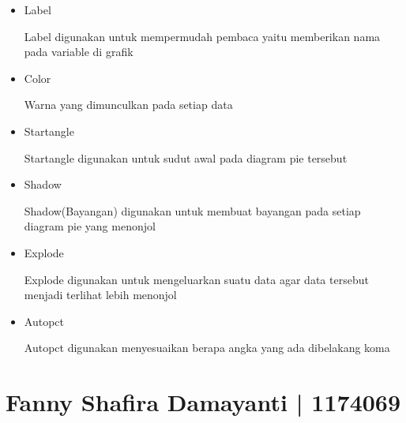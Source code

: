 \begin{enumerate}
\begin{itemize}
    \item Label
    
    Label digunakan untuk mempermudah pembaca yaitu memberikan nama pada variable di grafik
    
    \item Color
    
    Warna yang dimunculkan pada setiap data
    
    \item Startangle
    
    Startangle digunakan untuk sudut awal pada diagram pie tersebut
    
    \item Shadow
    
    Shadow(Bayangan) digunakan untuk membuat bayangan pada setiap diagram pie yang menonjol
    
    \item Explode

    Explode digunakan untuk mengeluarkan suatu data agar data tersebut menjadi terlihat lebih menonjol
    
    \item Autopct
    
    Autopct digunakan menyesuaikan berapa angka yang ada dibelakang koma
\end{itemize}
\end{enumerate}


\section{Fanny Shafira Damayanti | 1174069}
